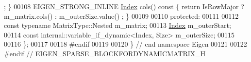\begin{DoxyCode}
      ; \}
00108     EIGEN\_STRONG\_INLINE \hyperlink{namespace_eigen_a62e77e0933482dafde8fe197d9a2cfde}{Index} cols()\textcolor{keyword}{ const }\{ \textcolor{keywordflow}{return} IsRowMajor ? m\_matrix.cols() : m\_outerSize.value()
      ; \}
00109 
00110   \textcolor{keyword}{protected}:
00111 
00112     \textcolor{keyword}{const} \textcolor{keyword}{typename} MatrixType::Nested m\_matrix;
00113     \hyperlink{namespace_eigen_a62e77e0933482dafde8fe197d9a2cfde}{Index} m\_outerStart;
00114     \textcolor{keyword}{const} internal::variable\_if\_dynamic<Index, Size> m\_outerSize;
00115 
00116 \};
00117 
00118 \textcolor{preprocessor}{#endif}
00119 
00120 \} \textcolor{comment}{// end namespace Eigen}
00121 
00122 \textcolor{preprocessor}{#endif // EIGEN\_SPARSE\_BLOCKFORDYNAMICMATRIX\_H}
\end{DoxyCode}
